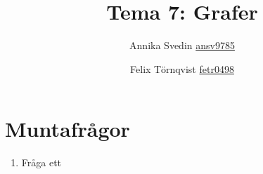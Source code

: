 \documentclass[a5paper,10pt,oneside]{article}
\title{Tema 7: Grafer}
\author{Annika Svedin \url{ansv9785} \and Felix Törnqvist \url{fetr0498}}
\begin{document}
\maketitle

\section*{Muntafrågor}

\begin{enumerate}
	\item Fråga ett
\end{enumerate}
\end{document}
